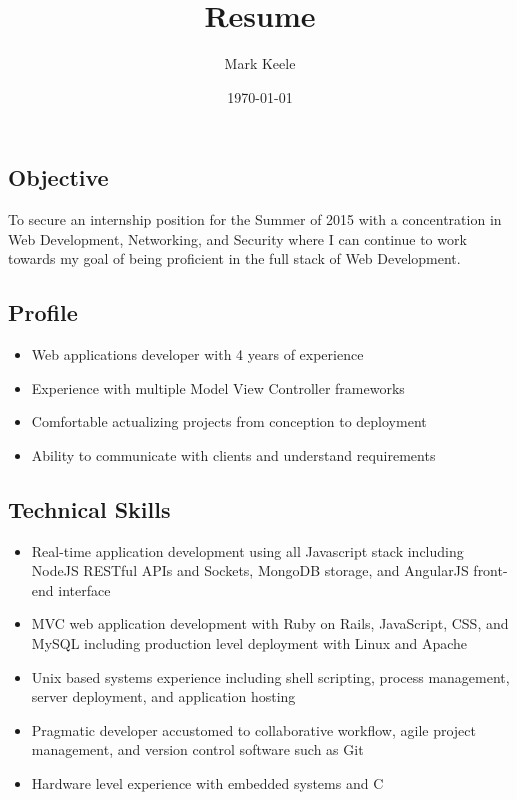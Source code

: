 \documentclass[12pt,letterpaper]{article}
\author{Mark Keele}
\title{Resume}
\date{\today}
\begin{document}
\subsection*{Objective}
To secure an internship position for the Summer of 2015 with a concentration
in Web Development, Networking, and Security where I can continue to
work towards my goal of being proficient in the full stack of Web Development.

\subsection*{Profile}

\begin{itemize}

  \item Web applications developer with 4 years of experience

  \item Experience with multiple Model View Controller frameworks

  \item Comfortable actualizing projects from conception to deployment

  \item Ability to communicate with clients and understand requirements

\end{itemize}

\subsection*{Technical Skills}

\begin{itemize}

  \item Real-time application development using all Javascript stack including
  NodeJS RESTful APIs and Sockets, MongoDB storage, and AngularJS front-end
  interface

  \item MVC web application development with Ruby on Rails, JavaScript, CSS, and
  MySQL including production level deployment with Linux and Apache

  \item Unix based systems experience including shell scripting, process management,
  server deployment, and application hosting

  \item Pragmatic developer accustomed to collaborative workflow,
  agile project management, and version control software such as Git

  \item Hardware level experience with embedded systems and C

\end{itemize}
\end{document}
